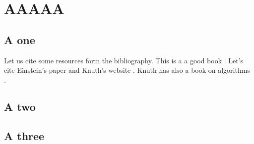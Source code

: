 \chapter{AAAAA}\label{ch:A}
\section{A one}
Let us cite some resources form the  bibliography. This is a a good book \cite{dirac}. Let's cite Einstein's paper \cite{einstein} and Knuth's website \cite{knuthwebsite}. Knuth has also a book on algorithms \cite{knuth-fa}.
\section{A two}
\section{A three}